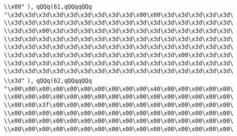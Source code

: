 \verb|\\x00"|\newline
\verb|),|\newline
\verb|qQQq(61,qQQqqQQq|\newline
\verb|"\x3d\x3d\x3d\x3d\x3d\x3d\x3d\x3d\x3d\x00\x00\x3d\x3d\x3d\x3d\x3d\|\newline
\verb|\\x3d\x3d\x3d\x3d\x3d\x3d\x3d\x3d\x3d\x3d\x3d\x3d\x3d\x3d\x3d\x3d\|\newline
\verb|\\x3d\x3d\x00\x3d\x3d\x3d\x3d\x3d\x3d\x3d\x3d\x3d\x3d\x3d\x3d\x3d\|\newline
\verb|\\x3d\x3d\x3d\x3d\x3d\x3d\x3d\x3d\x3d\x3d\x3d\x3d\x3d\x3d\x3d\x3d\|\newline
\verb|\\x3d\x3d\x3d\x3d\x3d\x3d\x3d\x3d\x3d\x3d\x3d\x3d\x3d\x3d\x3d\x3d\|\newline
\verb|\\x3d\x3d\x3d\x3d\x3d\x3d\x3d\x3d\x3d\x3d\x3d\x3d\x00\x3d\x3d\x3d\|\newline
\verb|\\x3d\x3d\x3d\x3d\x3d\x3d\x3d\x3d\x3d\x3d\x3d\x3d\x3d\x3d\x3d\x3d\|\newline
\verb|\\x3d\x3d\x3d\x3d\x3d\x3d\x3d\x3d\x3d\x3d\x3d\x3d\x3d\x3d\x3d\x3d\|\newline
\verb|\\x3d"|\newline
\verb|),|\newline
\verb|qQQq(62,qQQqqQQq|\newline
\verb|"\x00\x00\x00\x00\x00\x00\x00\x00\x00\x00\x40\x00\x00\x00\x00\x00\|\newline
\verb|\\x00\x00\x00\x00\x00\x00\x00\x00\x00\x00\x00\x00\x00\x00\x00\x00\|\newline
\verb|\\x00\x00\x3f\x00\x00\x00\x00\x00\x00\x00\x00\x00\x00\x00\x00\x00\|\newline
\verb|\\x00\x00\x00\x00\x00\x00\x00\x00\x00\x00\x00\x00\x00\x00\x00\x00\|\newline
\verb|\\x00\x00\x00\x00\x00\x00\x00\x00\x00\x00\x00\x00\x00\x00\x00\x00\|\newline
\verb|\\x00\x00\x00\x00\x00\x00\x00\x00\x00\x00\x00\x00\x00\x00\x00\x00\|\newline

